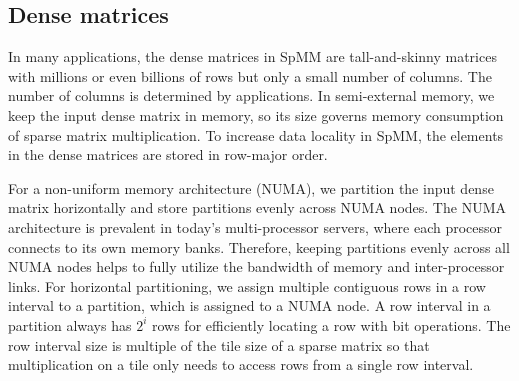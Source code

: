
\subsection{Dense matrices}
In many applications, the dense matrices in SpMM are
tall-and-skinny matrices with millions or even billions of rows but only a small
number of columns. The number of columns is determined by applications.
In semi-external memory,
we keep the input dense matrix in memory, so its size governs memory consumption
of sparse matrix multiplication. To increase data locality in SpMM, the elements
in the dense matrices are stored in row-major order.

For a non-uniform memory architecture (NUMA), we partition the input dense matrix
horizontally and store partitions evenly across NUMA nodes. The NUMA architecture
is prevalent in today's multi-processor servers, where each processor connects
to its own memory banks. Therefore, keeping partitions evenly across all NUMA
nodes helps to fully utilize the bandwidth of memory and inter-processor links.
For horizontal partitioning, we assign multiple contiguous rows in a row
interval to a partition, which is assigned to a NUMA node. A row interval
in a partition always has $2^i$ rows for efficiently locating a row
with bit operations. The row interval size is multiple of the tile size of
a sparse matrix so that multiplication on a tile only needs to access rows
from a single row interval.


